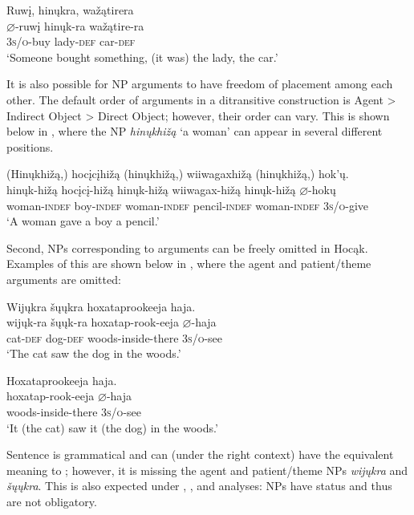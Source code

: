 \documentclass[output=paper]{LSP/langsci}
\begin{document}
\ex\label{ex:jrs:12e}
\glll Ruw\k{i}, 		hin\k{u}kra, 	wa\v{z}ątirera \\
$\varnothing$-ruw\k{i} 	hin\k{u}k-ra 	wa\v{z}ątire-ra \\ 
\textsc{3s/o}-buy lady-\textsc{def} car-\textsc{def} \\
\trans `Someone bought something, (it was) the lady, the car.'
\z
\z

It is also possible for NP arguments to have freedom of placement among each other. The default order of arguments in a ditransitive construction is Agent > Indirect Object > Direct Object; however, their order can vary.  This is shown below in , where the  NP \textit{hin\k{u}khi\v{z}ą} `a woman' can appear in several different positions.

\ea\label{ex:jrs:13}
\glll (Hin\k{u}khi\v{z}ą,) 	hoc\k{i}c\k{i}hi\v{z}ą 	(hin\k{u}khi\v{z}ą,) wiiwagaxhi\v{z}ą 	(hin\k{u}khi\v{z}ą,) hok'\k{u}.\\
hin\k{u}k-hi\v{z}ą 		hoc\k{i}c\k{i}-hi\v{z}ą 	hin\k{u}k-hi\v{z}ą 		wiiwagax-hi\v{z}ą 	hin\k{u}k-hi\v{z}ą 	$\varnothing$-hok\k{u}\\
	woman-\textsc{indef}	boy-\textsc{indef} 	woman-\textsc{indef} 	pencil-\textsc{indef} 	woman-\textsc{indef} 	\textsc{3s/o}-give\\
\trans `A woman gave a boy a pencil.'
\z
	
Second, NPs corresponding to arguments can be freely omitted in Hocąk. Examples of this are shown below in , where the agent and patient/theme arguments are omitted:

\ea\label{ex:jrs:14}
\ea \label{ex:jrs:14a} 
\glll Wij\k{u}kra	\v{s}\k{u}\k{u}kra		hoxataprookeeja 		haja.\\
wij\k{u}k-ra	\v{s}\k{u}\k{u}k-ra	hoxatap-rook-eeja 	$\varnothing$-haja \\
	cat-\textsc{def} 	dog-\textsc{def} 	woods-inside-there 	\textsc{3s/o}-see \\
\trans `The cat saw the dog in the woods.'

\ex \label{ex:jrs:14b}
\glll Hoxataprookeeja haja. \\
hoxatap-rook-eeja 	$\varnothing$-haja \\
woods-inside-there \textsc{3s/o}-see \\
\trans `It (the cat) saw it (the dog) in the woods.'
\z 
\z 

Sentence  is grammatical and can (under the right  context) have the equivalent meaning to ; however, it is missing the agent and patient/theme NPs \textit{wij\k{u}kra} and \textit{\v{s}\k{u}\k{u}kra}. This is also expected under , , and  analyses: NPs have  status and thus are not obligatory.
\end{document}
